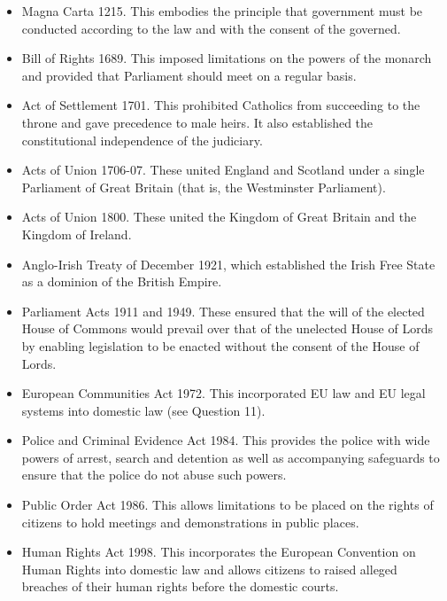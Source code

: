\documentclass[14pt,titlepage]{extarticle}
\begin{document}
\begin{itemize}
  
\item Magna Carta 1215. This embodies the principle that government must be conducted according to the law and with the consent of the governed.

\item Bill of Rights 1689. This imposed limitations on the powers of the monarch and provided that Parliament should meet on a regular basis.

\item Act of Settlement 1701. This prohibited Catholics from succeeding to the throne and gave precedence to male heirs. It also established the constitutional independence of the judiciary.

\item Acts of Union 1706-07. These united England and Scotland under a single Parliament of Great Britain (that is, the Westminster Parliament).

\item Acts of Union 1800. These united the Kingdom of Great Britain and the Kingdom of Ireland.

  \item  Anglo-Irish Treaty of December 1921, which established the Irish Free State as a dominion of the British Empire. 

\item Parliament Acts 1911 and 1949. These ensured that the will of the elected House of Commons would prevail over that of the unelected House of Lords by enabling legislation to be enacted without the consent of the House of Lords.

\item European Communities Act 1972. This incorporated EU law and EU legal systems into domestic law (see Question 11).

\item Police and Criminal Evidence Act 1984. This provides the police with wide powers of arrest, search and detention as well as accompanying safeguards to ensure that the police do not abuse such powers.

\item Public Order Act 1986. This allows limitations to be placed on the rights of citizens to hold meetings and demonstrations in public places.

\item Human Rights Act 1998. This incorporates the European Convention on Human Rights into domestic law and allows citizens to raised alleged breaches of their human rights before the domestic courts.


\end{itemize}
\end{document}
